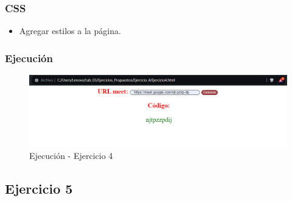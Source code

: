 \documentclass{article}
\begin{document}
	\subsubsection{CSS}
	\begin{itemize}
		\item Agregar estilos a la página.
		
	\end{itemize}
	\subsubsection{Ejecución}
	\begin{figure}[H]
		\centering
		\includegraphics[width=1\textwidth,keepaspectratio]{img/HTML3.png}
		\caption{Ejecución - Ejercicio 4}
	\end{figure}
	\newpage
	\subsection{Ejercicio 5}
\end{document}
